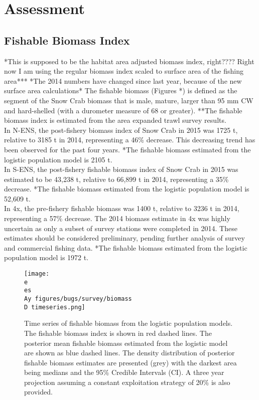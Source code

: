 \documentclass[paper=a4, fontsize=11pt]{article}
\newcommand{\D}{.}
\newcommand{\e}{/home/michelle/ecomod_data/}
\newcommand{\es}{snowcrab/}
\newcommand{\Ay}{assessments/2015/}
\begin{document}
\clearpage

\section{Assessment}

\subsection{Fishable Biomass Index}
*This is supposed to be the habitat area adjusted biomass index, right???? Right now I am using the regular biomass index scaled to surface area of the fishing area***
*The 2014 numbers have changed since last year, because of the new surface area calculations* The fishable biomass (Figures *) is defined as the segment of the Snow Crab biomass that is male, mature, larger than 95 mm CW and hard-shelled (with a durometer measure of 68 or greater). **The fishable biomass index is estimated from the area expanded trawl survey results.\\

In N-ENS, the post-fishery biomass index of Snow Crab in 2015 was 1725 t, relative to 3185 t in 2014, representing a 46\% decrease. This decreasing trend has been observed for the past four years. *The fishable biomass estimated from the logistic population model is 2105 t.\\

In S-ENS, the post-fishery fishable biomass index of Snow Crab in 2015 was estimated to be 43,238 t, relative to 66,899 t in 2014, representing a 35\% decrease. *The fishable biomass estimated from the logistic population model is 52,609 t.\\

In 4x, the pre-fishery fishable biomass was 1400 t, relative to 3236 t in 2014, representing a 57\% decrease. The 2014 biomass estimate in 4x was highly uncertain as only a subset of survey stations were completed in 2014. These estimates should be considered preliminary, pending further analysis of survey and commercial fishing data. *The fishable biomass estimated from the logistic population model is 1972 t.\\


\begin{figure}[ht]
    \centering
    \texttt{[image: \\e \\es \\Ay figures/bugs/survey/biomass\\D timeseries.png]}
    \caption{Time series of fishable biomass from the logistic population models. The fishable biomass index is shown in red dashed lines. The posterior mean fishable biomass estimated from the logistic model are shown as blue dashed lines. The density distribution of posterior fishable biomass estimates are presented (grey) with the darkest area being medians and the 95\% Credible Intervals (CI). A three year projection assuming a constant exploitation strategy of 20\% is also provided.}
\end{figure}
\clearpage
\end{document}
